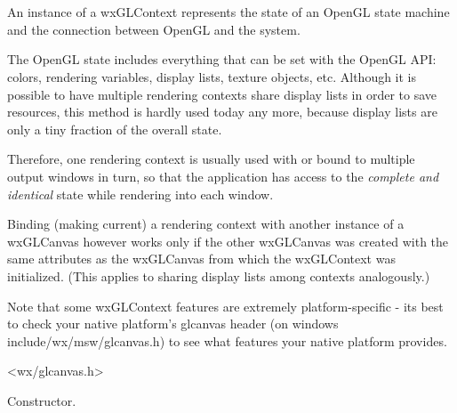 \section{}\label{wxglcontext}

An instance of a wxGLContext represents the state of an OpenGL state machine and the connection between OpenGL and the system.

The OpenGL state includes everything that can be set with the OpenGL API: colors, rendering variables, display lists, texture objects, etc.
Although it is possible to have multiple rendering contexts share display lists in order to save resources,
this method is hardly used today any more, because display lists are only a tiny fraction of the overall state.

Therefore, one rendering context is usually used with or bound to multiple output windows in turn,
so that the application has access to the \emph{complete and identical} state while rendering into each window.

Binding (making current) a rendering context with another instance of a wxGLCanvas however works only
if the other wxGLCanvas was created with the same attributes as the wxGLCanvas from which the wxGLContext
was initialized. (This applies to sharing display lists among contexts analogously.)

Note that some wxGLContext features are extremely platform-specific - its best to check your native platform's glcanvas header (on windows include/wx/msw/glcanvas.h) to see what features your native platform provides.




<wx/glcanvas.h>





\label{wxglcontextconstr}


Constructor.


